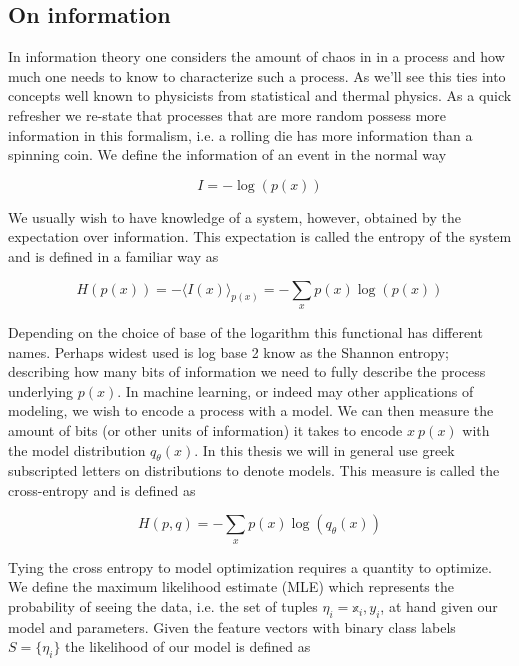\subsection{On information}

In information theory one considers the amount of chaos in in a process and how much one needs to know to characterize such a process. As we'll see this ties into concepts well known to physicists from statistical and thermal physics. As a quick refresher we re-state that processes that are more random possess more information in this formalism, i.e. a rolling die has more information than a spinning coin. We define the information of an event in the normal way 

\begin{equation}
I = -\log(p(x))
\end{equation} 

\noindent We usually wish to have knowledge of a system, however, obtained by the expectation over information. This expectation is called the entropy of the system and is defined in a familiar way as 

\begin{equation}
H(p(x)) = -\langle I(x) \rangle_{p(x)} = - \sum _x p(x)\log(p(x))
\end{equation}

\noindent Depending on the choice of base of the logarithm this functional has different names. Perhaps widest used is log base 2 know as the Shannon entropy; describing how many bits of information we need to fully describe the process underlying $p(x)$. In machine learning, or indeed may other applications of modeling, we wish to encode a process with a model. We can then measure the amount of bits (or other units of information) it takes to encode $x ~ p(x)$ with the model distribution $q_{\theta}(x)$. In this thesis we will in general use greek subscripted letters on distributions to denote models. This measure is called the cross-entropy and is defined as

\begin{equation}
H(p, q) = - \sum_x p(x)\log(q_\theta(x))
\end{equation}

\noindent Tying the cross entropy to model optimization requires a quantity to optimize. We define the maximum likelihood estimate (MLE) which represents the probability of seeing the data, i.e. the set of tuples $\eta_i = {\mathbb{x}_i, y_i}$, at hand given our model and parameters. Given the feature vectors with binary class labels $S = \{\eta_i\}$ the likelihood of our model is defined as 

